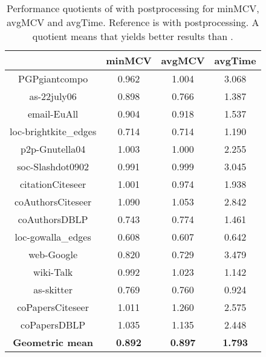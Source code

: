 \documentclass[pdftex]{llncs}
\numberwithin{equation}{section}
\numberwithin{example}{section}
\numberwithin{table}{section}
\begin{document}
\begin{table}[tb]
  \caption{Performance quotients of  with postprocessing for minMCV, avgMCV
    and avgTime. Reference is  with postprocessing. A quotient  means that
     yields better results than .}
\begin{center}
\begin{tabular}{ c | c  c | c }
& minMCV  & avgMCV & avgTime\\
                        \hline \hline
PGPgiantcompo           &  0.962              &  1.004               &  3.068              \\ \hline
as-22july06             &  0.898              &  0.766               &  1.387              \\ \hline
email-EuAll             &  0.904              &  0.918               &  1.537              \\ \hline
loc-brightkite\_edges   &  0.714              &  0.714               &  1.190              \\ \hline
p2p-Gnutella04          &  1.003              &  1.000               &  2.255              \\ \hline
soc-Slashdot0902        &  0.991              &  0.999               &  3.045              \\ \hline
citationCiteseer        &  1.001              &  0.974               &  1.938              \\ \hline
coAuthorsCiteseer       &  1.090              &  1.053               &  2.842              \\ \hline 
coAuthorsDBLP           &  0.743              &  0.774               &  1.461              \\ \hline
loc-gowalla\_edges      &  0.608              &  0.607               &  0.642              \\ \hline
web-Google              &  0.820              &  0.729               &  3.479              \\ \hline
wiki-Talk               &  0.992              &  1.023               &  1.142              \\ \hline
as-skitter              &  0.769              &  0.760               &  0.924              \\ \hline
coPapersCiteseer        &  1.011              &  1.260               &  2.575              \\ \hline
coPapersDBLP            &  1.035              &  1.135               &  2.448              \\ \hline  \hline
\textbf{Geometric mean} &  \textbf{0.892}     &  \textbf{0.897}      &\textbf{1.793}       \\ \hline
\end{tabular}
\end{center}
\label{tab:MCV_20}
\end{table}
\end{document}
